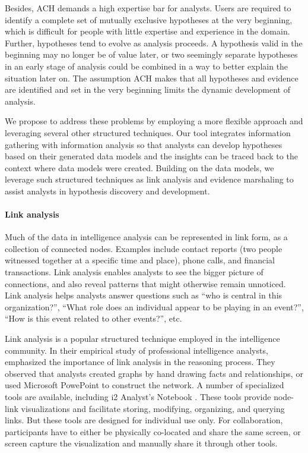Besides, ACH demands a high expertise bar for analysts. Users are required to identify a complete set of mutually exclusive hypotheses at the very beginning, which is difficult for people with little expertise and experience in the domain. Further, hypotheses tend to evolve as analysis proceeds. A hypothesis valid in the beginning may no longer be of value later, or two seemingly separate hypotheses in an early stage of analysis could be combined in a way to better explain the situation later on. The assumption ACH makes that all hypotheses and evidence are identified and set in the very beginning limits the dynamic development of analysis. 

We propose to address these problems by employing a more flexible approach and leveraging several other structured techniques. Our tool integrates information gathering with information analysis so that analysts can develop hypotheses based on their generated data models and the insights can be traced back to the context where data models were created. Building on the data models, we leverage such structured techniques as link analysis and evidence marshaling to assist analysts in hypothesis discovery and development. 
 

\paragraph{Link analysis}
Much of the data in intelligence analysis can be represented in link form, as a collection of connected nodes.  Examples include contact reports (two people witnessed together at a specific time and place), phone calls, and financial transactions. Link analysis enables analysts to see the bigger picture of connections, and also reveal patterns that might otherwise remain unnoticed. Link analysis helps analysts answer questions such as “who is central in this organization?”, “What role does an individual appear to be playing in an event?”, “How is this event related to other events?”, etc.
 
Link analysis is a popular structured technique employed in the intelligence community. In their empirical study of professional intelligence analysts, \cite{Chin2009} emphasized the importance of link analysis in the reasoning process. They observed that analysts created graphs by hand drawing facts and relationships, or used Microsoft PowePoint to construct the network. A number of specialized tools are available, including i2 Analyst’s Notebook \citep{IBM}.  These tools provide node-link visualizations and facilitate storing, modifying, organizing, and querying links. But these tools are designed for individual use only. For collaboration, participants have to either be physically co-located and share the same screen, or screen capture the visualization and manually share it through other tools. 

